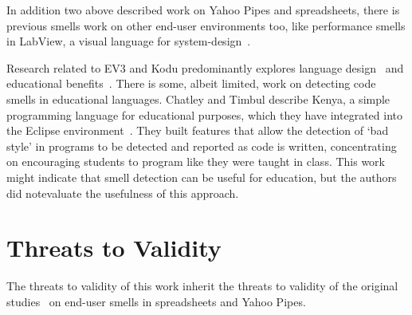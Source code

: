 \documentclass[conference]{IEEEtran}
\begin{document}
In addition two above described work on Yahoo Pipes and spreadsheets, there is previous smells work on other end-user environments too, like performance smells in LabView, a visual language for system-design~\cite{chambers2013smell, chambers2015impact}. 

Research related to  EV3 and Kodu predominantly explores 
language design~\cite{Fristoe:2011:SSE:2159365.2159396, Stolee:2011:ECS:1953163.1953197, MacLaurin:2009:KEP:1536513.1536516, MacLaurin:2011:DKT:1925844.1926413} 
and educational benefits~\cite{Fowler:2011:KGL:2159365.2159398, Touretzky:2013:AKC:2445196.2445374, Barnes:2002:TIJ:563340.563397, Hood:2005:TPL:1067445.1067454}. 
There is some, albeit limited, work on detecting code smells in educational languages. Chatley and Timbul describe Kenya, a simple programming language for educational purposes, which they have integrated into the Eclipse environment~\cite{Chatley2005}. They built features that allow the detection of `bad style' in programs to be detected and reported as code is written, concentrating on encouraging students to program like they were taught in class. This work might indicate that smell detection can be useful for education, but the authors  did notevaluate the usefulness of this approach.


%
%
%



\section{Threats to Validity}
\label{sec:threats}
The threats to validity of this work inherit the threats to validity of the original studies~\cite{Stolee2015, Stolee2011, StoleeTSE2013, Hermans2011, Hermans2012intra, Hermans2012inter} on end-user smells in spreadsheets and Yahoo Pipes.

\end{document}
